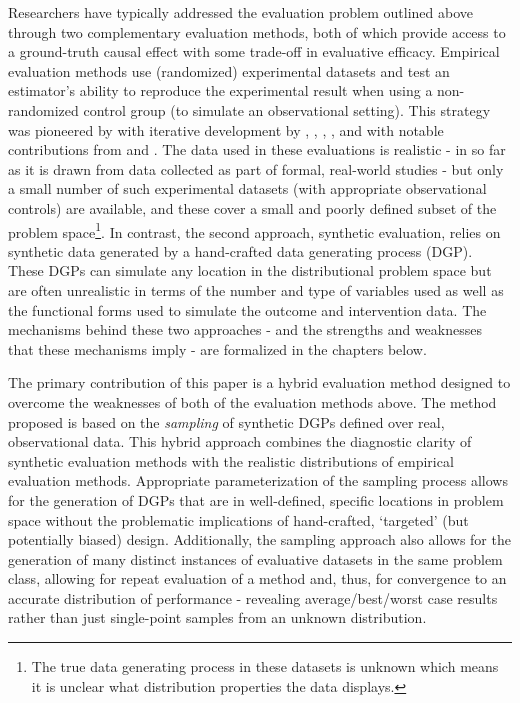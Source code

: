 \documentclass[../main.tex]{subfiles}
\begin{document}
\vspace{\baselineskip}
Researchers have typically addressed the evaluation problem outlined above through two complementary evaluation methods, both of which provide access to a ground-truth causal effect with some trade-off in evaluative efficacy. Empirical evaluation methods use (randomized) experimental datasets and test an estimator’s ability to reproduce the experimental result when using a non-randomized control group (to simulate an observational setting). This strategy was pioneered by \textcite{Lalonde1986EvaluatingData} with iterative development by \textcite{Heckman1998MatchingEstimator}, \textcite{Dehejia1999CausalPrograms}, \textcite{Dehejia2002PropensityStudies}, \textcite{Dehejia2005PracticalTodd}, and \textcite{Smith2005DoesEstimators} with notable contributions from \textcite{Hill2005AAnalyses} and \textcite{Shadish2008CanAssignments}. The data used in these evaluations is realistic - in so far as it is drawn from data collected as part of formal, real-world studies - but only a small number of such experimental datasets (with appropriate observational controls) are available, and these cover a small and poorly defined subset of the problem space\footnote{ The true data generating process in these datasets is unknown which means it is unclear what distribution properties the data displays. }. In contrast, the second approach, synthetic evaluation, relies on synthetic data generated by a hand-crafted data generating process (DGP). These DGPs can simulate any location in the distributional problem space but are often unrealistic in terms of the number and type of variables used as well as the functional forms used to simulate the outcome and intervention data. The mechanisms behind these two approaches - and the strengths and weaknesses that these mechanisms imply - are formalized in the chapters below.\par


\vspace{\baselineskip}
The primary contribution of this paper is a hybrid evaluation method designed to overcome the weaknesses of both of the evaluation methods above. The method proposed is based on the \textit{sampling} of synthetic DGPs defined over real, observational data. This hybrid approach combines the diagnostic clarity of synthetic evaluation methods with the realistic distributions of empirical evaluation methods. Appropriate parameterization of the sampling process allows for the generation of DGPs that are in well-defined, specific locations in problem space without the problematic implications of hand-crafted, ‘targeted’ (but potentially biased) design. Additionally, the sampling approach also allows for the generation of many distinct instances of evaluative datasets in the same problem class, allowing for repeat evaluation of a method and, thus, for convergence to an accurate distribution of performance - revealing average/best/worst case results rather than just single-point samples from an unknown distribution.\par
\end{document}
